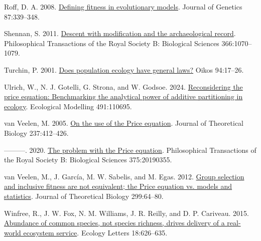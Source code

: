 \documentclass[
]{article}
\newlength{\cslhangindent}
\newenvironment{CSLReferences}[2] %
 {\begin{list}{}{%
  \setlength{\itemindent}{0pt}
  \setlength{\leftmargin}{0pt}
  \setlength{\parsep}{0pt}
  \ifodd #1
   \setlength{\leftmargin}{\cslhangindent}
   \setlength{\itemindent}{-1\cslhangindent}
  \fi
  \setlength{\itemsep}{#2\baselineskip}}}
 {\end{list}}
\begin{document}
\begin{CSLReferences}{0}{0}
Roff, D. A. 2008.
\href{https://doi.org/10.1007/s12041-008-0056-9}{{Defining fitness in
evolutionary models}}. Journal of Genetics 87:339--348.

Shennan, S. 2011. \href{https://doi.org/10.1098/rstb.2010.0380}{{Descent
with modification and the archaeological record}}. Philosophical
Transactions of the Royal Society B: Biological Sciences 366:1070--1079.

Turchin, P. 2001.
\href{https://doi.org/10.1034/j.1600-0706.2001.11310.x}{Does population
ecology have general laws?} Oikos 94:17--26.

Ulrich, W., N. J. Gotelli, G. Strona, and W. Godsoe. 2024.
\href{https://doi.org/10.1016/j.ecolmodel.2024.110695}{Reconsidering the
price equation: Benchmarking the analytical power of additive
partitioning in ecology}. Ecological Modelling 491:110695.

van Veelen, M. 2005.
\href{https://doi.org/10.1016/j.jtbi.2005.04.026}{{On the use of the
Price equation}}. Journal of Theoretical Biology 237:412--426.

---------. 2020. \href{https://doi.org/10.1098/rstb.2019.0355}{{The
problem with the Price equation}}. Philosophical Transactions of the
Royal Society B: Biological Sciences 375:20190355.

van Veelen, M., J. García, M. W. Sabelis, and M. Egas. 2012.
\href{https://doi.org/10.1016/j.jtbi.2011.07.025}{{Group selection and
inclusive fitness are not equivalent; the Price equation vs. models and
statistics}}. Journal of Theoretical Biology 299:64--80.

Winfree, R., J. W. Fox, N. M. Williams, J. R. Reilly, and D. P.
Cariveau. 2015. \href{https://doi.org/10.1111/ele.12424}{{Abundance of
common species, not species richness, drives delivery of a real-world
ecosystem service}}. Ecology Letters 18:626--635.

\end{CSLReferences}
\end{document}
